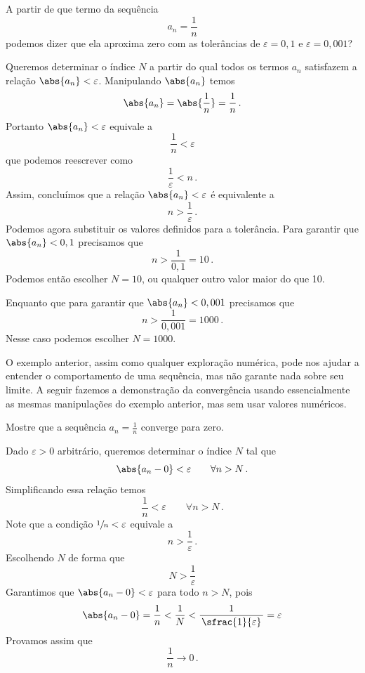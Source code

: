 \begin{example}
  A partir de que termo da sequência
  \[
    a_n = \frac{1}{n}
  \]
  podemos dizer que ela aproxima zero com as tolerâncias de
  $\varepsilon=0,1$ e $\varepsilon=0,001$?

  \solution

  Queremos determinar o índice $N$ a partir do qual
  todos os termos $a_n$ satisfazem a relação \(\abs{a_n} < \varepsilon\).
  Manipulando $\abs{a_n}$ temos
  \[
    \abs{a_n} = \abs{\frac{1}{n}} = \frac{1}{n} \,.
  \]
  Portanto \(\abs{a_n} < \varepsilon\) equivale a
  \[
    \frac{1}{n} < \varepsilon
  \]
  que podemos reescrever como
  \[
    \frac{1}{\varepsilon} < n \,.
  \]
  Assim, concluímos que a relação \(\abs{a_n} < \varepsilon\) é equivalente a
  \[
    n > \frac{1}{\varepsilon} \,.
  \]
  Podemos agora substituir os valores definidos para a tolerância.
  Para garantir que \(\abs{a_n} < 0,1\) precisamos que
  \[
    n > \frac{1}{0,1} = 10 \,.
  \]
  Podemos então escolher $N=10$, ou qualquer outro valor maior do que 10.

  Enquanto que para garantir que \(\abs{a_n} < 0,001\) precisamos que
  \[
    n > \frac{1}{0,001} = 1000 \,.
  \]
  Nesse caso podemos escolher $N=1000$.
\end{example}

O exemplo anterior, assim como qualquer exploração numérica, pode nos ajudar
a entender o comportamento de uma sequência, mas não garante nada sobre seu
limite. A seguir fazemos a demonstração da convergência usando essencialmente
as mesmas manipulações do exemplo anterior, mas sem usar valores numéricos.

\begin{example}
  Mostre que a sequência
  \(
    a_n = \frac{1}{n}
  \)
  converge para zero.

  \solution
  Dado \(\varepsilon>0\) arbitrário, queremos determinar o índice $N$ tal que
  \[
    \abs{a_n-0} < \varepsilon \qquad \forall n > N \,.
  \]
  Simplificando essa relação temos
  \[
    \frac{1}{n} < \varepsilon \qquad \forall n > N \,.
  \]
  Note que a condição \(\sfrac{1}{n} < \varepsilon\) equivale a
  \[
    n > \frac{1}{\varepsilon} \,.
  \]
  Escolhendo $N$ de forma que
  \[
    N > \frac{1}{\varepsilon}
  \]
  Garantimos que \(\abs{a_n-0} < \varepsilon\) para todo $n>N$, pois
  \[
    \abs{a_n-0} = \frac{1}{n} < \frac{1}{N} < \frac{1}{\,\sfrac{1}{\varepsilon}\,} = \varepsilon
  \]
  Provamos assim que
  \[
    \frac{1}{n} \to 0 \,.
  \]
\end{example}

